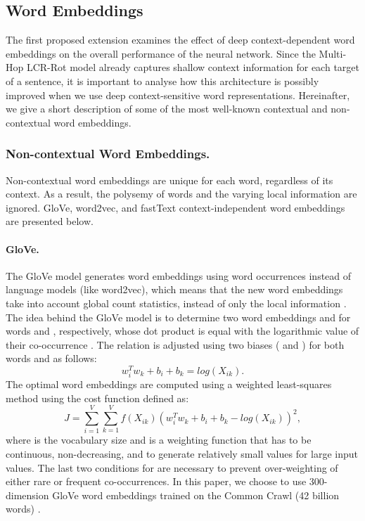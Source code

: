 \documentclass[hidelinks]{llncs}
\begin{document}
\subsection{Word Embeddings}\label{Embeddings}

The first proposed extension examines the effect of deep context-dependent word embeddings on the overall performance of the neural network. Since the Multi-Hop LCR-Rot model already captures shallow context information for each target of a sentence, it is important to analyse how this architecture is possibly improved when we use deep context-sensitive word representations. Hereinafter, we give a short description of some of the most well-known contextual and non-contextual word embeddings.


\subsubsection{Non-contextual Word Embeddings. }Non-contextual word embeddings are unique for each word, regardless of its context. As a result, the polysemy of words and the varying local information are ignored. GloVe, word2vec, and fastText context-independent word embeddings are presented below.

\paragraph{GloVe. }The GloVe model generates word embeddings using word occurrences instead of language models (like word2vec), which means that the new word embeddings take into account global count statistics, instead of only the local information \cite{pennington2014glove}. The idea behind the GloVe model is to determine two word embeddings  and  for words  and , respectively, whose dot product is equal with the logarithmic value of their co-occurrence . The relation is adjusted using two biases ( and ) for both words  and  as follows:
\begin {equation}
\label{equation5}
{w^T_i}{w_k} + {b_i} + {b_k} = log({X_{ik}}).
\end {equation}
The optimal word embeddings are computed using a weighted least-squares method using the cost function defined as:
\begin {equation}
\label{equation6}
J = \sum_{i=1}^{V} {\sum_{k = 1}^{V}f(X_{ik})({w^T_i}{w_k} + {b_i} + {b_k} - log({X_{ik}}))^2},
\end {equation}
where  is the vocabulary size and  is a weighting function that has to be continuous, non-decreasing, and to generate relatively small values for large input values. The last two conditions for  are necessary to prevent over-weighting of either rare or frequent co-occurrences. In this paper, we choose to use 300-dimension GloVe word embeddings trained on the Common Crawl (42 billion words) \cite{pennington2014glove}.
\end{document}
